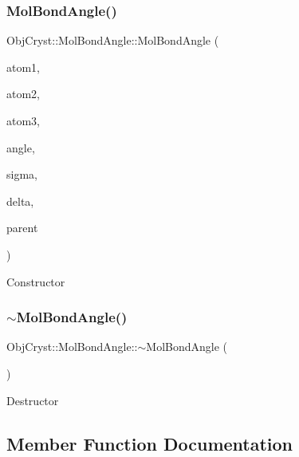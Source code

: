 \subsubsection{\texorpdfstring{MolBondAngle()}{MolBondAngle()}}
{\footnotesize\ttfamily Obj\+Cryst\+::\+Mol\+Bond\+Angle\+::\+Mol\+Bond\+Angle (\begin{DoxyParamCaption}\item[{\mbox{\hyperlink{class_obj_cryst_1_1_mol_atom}{Mol\+Atom}} \&}]{atom1,  }\item[{\mbox{\hyperlink{class_obj_cryst_1_1_mol_atom}{Mol\+Atom}} \&}]{atom2,  }\item[{\mbox{\hyperlink{class_obj_cryst_1_1_mol_atom}{Mol\+Atom}} \&}]{atom3,  }\item[{const R\+E\+AL}]{angle,  }\item[{const R\+E\+AL}]{sigma,  }\item[{const R\+E\+AL}]{delta,  }\item[{\mbox{\hyperlink{class_obj_cryst_1_1_molecule}{Molecule}} \&}]{parent }\end{DoxyParamCaption})}

Constructor \mbox{\label{class_obj_cryst_1_1_mol_bond_angle_aeaaf746bb55510479c05a908054b5017}} 
\subsubsection{\texorpdfstring{$\sim$MolBondAngle()}{~MolBondAngle()}}
{\footnotesize\ttfamily Obj\+Cryst\+::\+Mol\+Bond\+Angle\+::$\sim$\+Mol\+Bond\+Angle (\begin{DoxyParamCaption}{ }\end{DoxyParamCaption})\hspace{0.3cm}{\ttfamily [virtual]}}

Destructor 

\subsection{Member Function Documentation}
\mbox{\label{class_obj_cryst_1_1_mol_bond_angle_a289950992c7e264f7d2a307db367eaa1}} 
